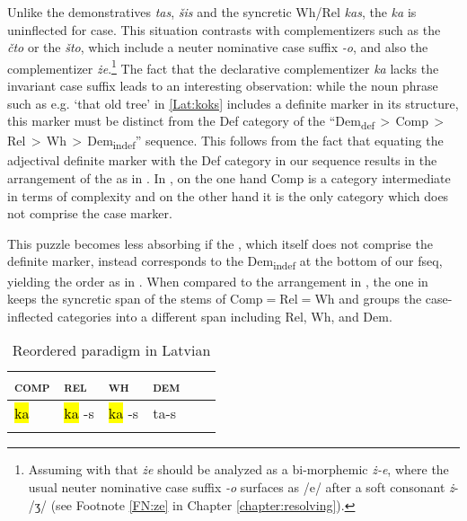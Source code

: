 \noindent Unlike the demonstratives \textit{tas}, \textit{\v{s}is} and the syncretic Wh/Rel  \mbox{\textit{kas}}, the  \textit{ka} is uninflected for case. 
This situation contrasts with complementizers such as the  \textit{\v{c}to} or the  \textit{\v{s}to}, which include a neuter nominative case suffix \textit{-o}, and also the  complementizer \textit{\.ze}.\footnote{Assuming with \cite{BaunazLander2018} that \textit{\.ze} should be analyzed as a bi-morphemic \textit{\.z-e}, where the usual neuter nominative case suffix \textit{-o} surfaces as /e/ after a soft consonant \textit{\.z}- /ʒ/ (see Footnote \ref{FN:ze} in  Chapter \ref{chapter:resolving}).
} %
The fact that the  declarative complementizer \textit{ka} lacks the invariant case suffix leads to an interesting observation: while the  noun phrase such as e.g. `that old tree' in \ref{Lat:koks} includes a definite marker in its structure, this marker must be distinct from the Def category of the ``Dem\textsubscript{def}\,$>$\,Comp\,$>$\,Rel\,$>$\,Wh\,$>$\,Dem\textsubscript{indef}'' sequence. This follows from the fact that equating the adjectival definite marker with the Def category in our sequence results in the arrangement of the  as in . In , on the one hand Comp is a category intermediate in terms of complexity and on the other hand it is the only category which does not comprise the case marker.

This puzzle becomes less absorbing if the  , which itself does not comprise the definite marker, instead corresponds to the Dem\textsubscript{indef} at the bottom of our fseq, yielding the order as in . When compared to the arrangement in , the one in  keeps the syncretic span of the stems of Comp$=$Rel$=$Wh and groups the case-inflected categories into a different span including Rel, Wh, and Dem.

\begin{table}
\caption{Reordered paradigm in Latvian}
\label{Lat:solution}
\begin{tabular}[h]{ l l l l l l }
\lsptoprule
\textsc{comp} 	& \textsc{rel}  	& \textsc{wh} & \textsc{dem} \\
\midrule	
\hl{ ka } & \hl{ ka }-s & \hl{ ka }-s & ta-s\\
\lspbottomrule
\end{tabular}
\end{table}

